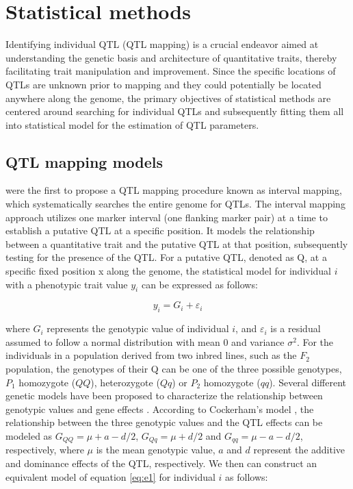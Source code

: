 \section{Statistical methods}

Identifying individual QTL (QTL mapping) is a crucial endeavor aimed at understanding the genetic basis and architecture of quantitative traits, thereby facilitating trait manipulation and improvement. Since the specific locations of QTLs are unknown prior to mapping and they could potentially be located anywhere along the genome, the primary objectives of statistical methods are centered around searching for individual QTLs and subsequently fitting them all into statistical model for the estimation of QTL parameters.

\subsection{QTL mapping models}

\citet{Lander-1989} were the first to propose a QTL mapping procedure known as interval mapping, which systematically searches the entire genome for QTLs. The interval mapping approach utilizes one marker interval (one flanking marker pair) at a time to establish a putative QTL at a specific position. It models the relationship between a quantitative trait and the putative QTL at that position, subsequently testing for the presence of the QTL. For a putative QTL, denoted as Q, at a specific fixed position x along the genome, the statistical model for individual $i$ with a phenotypic trait value $y_{i}$ can be expressed as follows: 

\begin{equation} 
	y_{i} = G_{i} + \varepsilon_{i} \label{eq:e1}
\end{equation} 

\noindent where $G_{i}$ represents the genotypic value of individual $i$, and $\varepsilon_{i}$ is a residual assumed to follow a normal distribution with mean $0$ and variance $\sigma ^{2}$. For the individuals in a population derived from two inbred lines, such as the $F_2$ population, the genotypes of their Q can be one of the three possible genotypes, $P_{1}$ homozygote ($QQ$), heterozygote ($Qq$) or $P_{2}$ homozygote ($qq$). Several different genetic models have been proposed to characterize the relationship between genotypic values and gene effects \citep{Cockerham-1954, van-1959, Weir-1977, Kao-2002}. According to Cockerham’s model \citep{Kao-2002}, the relationship between the three genotypic values and the QTL effects can be modeled as $G_{QQ}=\mu+a-d/2$, $G_{Qq}=\mu+d/2$ and $G_{qq}=\mu-a-d/2$, respectively, where $\mu$ is the mean genotypic value, $a$ and $d$ represent the additive and dominance effects of the QTL, respectively. We then can construct an equivalent model of equation \ref{eq:e1} for individual $i$ as follows: 

